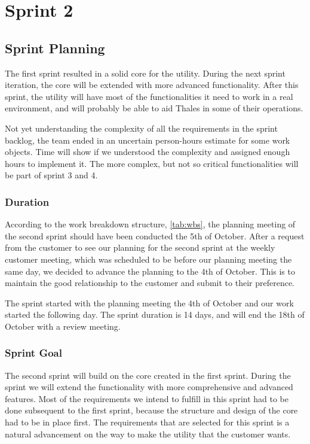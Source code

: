 \chapter{Sprint 2}


\section{Sprint Planning}
The first sprint resulted in a solid core for the utility. During the next sprint iteration, the core will be extended with more advanced functionality. After this sprint, the utility will have most of the functionalities it need to work in a real environment, and will probably be able to aid Thales in some of their operations.

Not yet understanding the complexity of all the requirements in the sprint backlog, the team ended in an uncertain person-hours estimate for some work objects. Time will show if we understood the complexity and assigned enough hours to implement it. The more complex, but not so critical functionalities will be part of sprint 3 and 4.   



\subsection{Duration}
According to the work breakdown structure, \autoref{tab:wbs}, the planning meeting of the second sprint should have been conducted the 5th of October. After a request from the customer to see our planning for the second sprint at the weekly customer meeting, which was scheduled to be before our planning meeting the same day, we decided to advance the planning to the 4th of October. This is to maintain the good relationship to the customer and submit to their preference.

The sprint started with the planning meeting the 4th of October and our work started the following day. The sprint duration is 14 days, and will end the 18th of October with a review meeting.  

\subsection{Sprint Goal}
The second sprint will build on the core created in the first sprint. During the sprint we will extend the functionality with more comprehensive and advanced features. Most of the requirements we intend to fulfill in this sprint had to be done subsequent to the first sprint, because the structure and design of the core had to be in place first. The requirements that are selected for this sprint is a natural advancement on the way to make the utility that the customer wants. 

